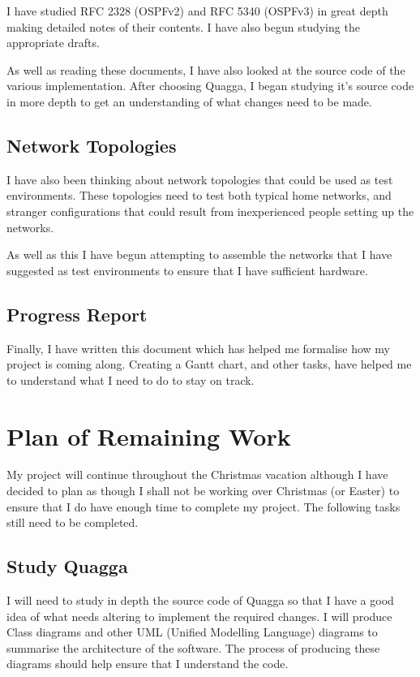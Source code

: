 \documentclass[12pt]{report}
\begin{document}
I have studied RFC 2328 (OSPFv2) and RFC 5340 (OSPFv3) in great depth making
detailed notes of their contents. I have also begun studying the appropriate
drafts.

As well as reading these documents, I have also looked at the source code of the
various implementation. After choosing Quagga, I began studying it's source code
in more depth to get an understanding of what changes need to be made. 

\section{Network Topologies}
I have also been thinking about network topologies that could be
used as test environments. These topologies need to test both typical home
networks, and stranger configurations that could result from inexperienced
people setting up the networks. 
 
As well as this I have begun attempting to assemble the networks that I have
suggested as test environments to ensure that I have sufficient hardware. 

\section{Progress Report}
Finally, I have written this document which has helped me formalise how my
project is coming along. Creating a Gantt chart, and other tasks, have helped me
to understand what I need to do to stay on track.

\chapter{Plan of Remaining Work}
My project will continue throughout the Christmas vacation although I have
decided to plan as though I shall not be working over Christmas (or Easter) to
ensure that I do have enough time to complete my project. The following tasks
still need to be completed.

\section{Study Quagga}
I will need to study in depth the source code of Quagga so that I have a
good idea of what needs altering to implement the required changes. I will
produce Class diagrams and other UML (Unified Modelling Language) diagrams to 
summarise the architecture of the software. The process of producing these
diagrams should help ensure that I understand the code. 
\end{document}
